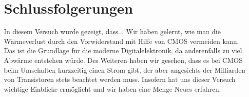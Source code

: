 \documentclass[12pt,a4paper]{scrartcl}
\begin{document}
\section{Schlussfolgerungen}
In diesem Versuch wurde gezeigt, dass...
Wir haben gelernt, wie man die W\"armeverlust durch den Vorwiderstand mit Hilfe von CMOS vermeiden kann.
Das ist die Grundlage f\"ur die moderne Digitalelektronik, da anderenfalls zu viel Abw\"arme entstehen w\"urde.
Des Weiteren haben wir gesehen, dass es bei CMOS beim Umschalten kurzzeitig einen Strom gibt, der aber angesichts der Milliarden von Transistoren stets beachtet werden muss.
Insofern hat uns dieser Versuch wichtige Einblicke erm\"oglicht und wir haben eine Menge Neues erfahren.
\end{document}
